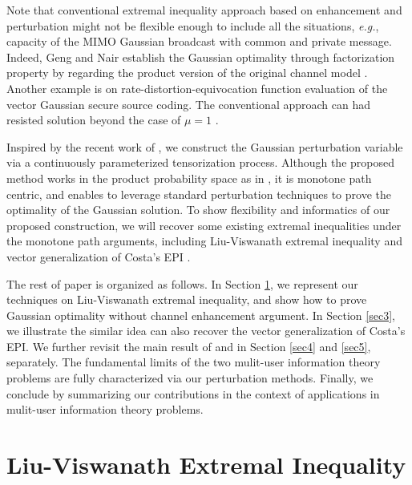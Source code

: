 \documentclass[journal,final, onecolumn]{IEEEtran}
\begin{document}
Note that conventional extremal inequality approach based on enhancement and perturbation might not be flexible enough to include all the situations, \emph{e.g.}, capacity of the MIMO Gaussian broadcast with common and private message. Indeed, Geng and Nair establish the Gaussian optimality through factorization property by regarding the product version of the original channel model \cite{GN14}. Another example is on rate-distortion-equivocation function evaluation of the vector Gaussian secure source coding. The conventional approach can had resisted solution beyond the case of $\mu=1$ \cite{EU13}.

Inspired by the recent work of \cite{WC19,XGLC20}, we construct the Gaussian perturbation variable via a continuously parameterized tensorization process. Although the proposed method works in the product probability space as in \cite{GN14}, it is monotone path centric, and enables to leverage standard perturbation techniques  \cite{LV07,XW13} to prove the optimality of the Gaussian solution. To show flexibility and informatics of our proposed construction, we will recover some existing extremal inequalities under the monotone path arguments, including Liu-Viswanath extremal inequality \cite{LV07} and vector generalization of Costa's EPI \cite{LLPS13}.

The rest of paper is organized as follows. In Section \ref{sec2}, we represent our techniques on Liu-Viswanath extremal inequality, and show how to prove Gaussian optimality without channel enhancement argument. In Section \ref{sec3}, we illustrate the similar idea can also recover the vector generalization of Costa's EPI. We further revisit the main result of \cite{GN14} and \cite{EU13} in Section \ref{sec4} and \ref{sec5}, separately.
The fundamental limits of the two mulit-user information theory problems are fully characterized via our perturbation methods. Finally, we conclude by summarizing our contributions in the context of applications in mulit-user information theory problems.


\section{Liu-Viswanath Extremal Inequality} \label{sec2}
\end{document}
